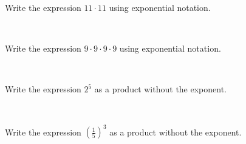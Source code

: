 \documentclass{ximera}
\begin{document}
\begin{question} Write the expression $11 \cdot 11 $ using exponential notation.

 ~ \\[3em]  %

\begin{multipleChoice}
  \end{multipleChoice}

\end{question}


\begin{question} Write the expression $9 \cdot 9 \cdot 9 \cdot 9$ using exponential notation.

 ~ \\[3em]  %

\begin{multipleChoice}
  \end{multipleChoice}

\end{question}


\begin{question} Write the expression $2^5$ as a product without the exponent.

 ~ \\[3em]  %

\begin{multipleChoice}
  \end{multipleChoice}

\end{question}


\begin{question} Write the expression $\left(\displaystyle\frac{1}{5} \right)^3$ as a product without the exponent.

  ~ \\[3em]  %

\begin{multipleChoice}
  \end{multipleChoice}

\end{question}
\end{document}
